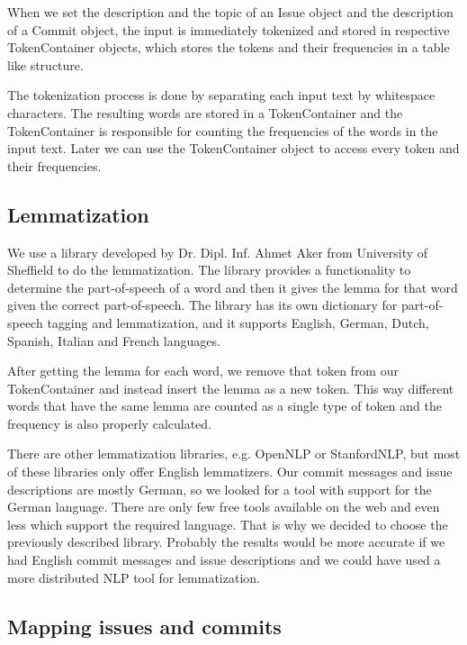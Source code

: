 When we set the description and the topic of an Issue object and the description of a Commit object, the input is immediately tokenized and stored in respective TokenContainer objects, which stores the tokens and their frequencies in a table like structure.

The tokenization process is done by separating each input text by whitespace characters.
The resulting words are stored in a TokenContainer and the TokenContainer is responsible for counting the frequencies of the words in the input text.
Later we can use the TokenContainer object to access every token and their frequencies.


\subsection{Lemmatization}

We use a library developed by Dr. Dipl. Inf. Ahmet Aker from University of Sheffield to do the lemmatization.
The library provides a functionality to determine the part-of-speech of a word and then it gives the lemma for that word given the correct part-of-speech.
The library has its own dictionary for part-of-speech tagging and lemmatization, and it supports English, German, Dutch, Spanish, Italian and French languages.

After getting the lemma for each word, we remove that token from our TokenContainer and instead insert the lemma as a new token.
This way different words that have the same lemma are counted as a single type of token and the frequency is also properly calculated.

There are other lemmatization libraries, e.g. OpenNLP or StanfordNLP, but most of these libraries only offer English lemmatizers.
Our commit messages and issue descriptions are mostly German, so we looked for a tool with support for the German language.
There are only few free tools available on the web and even less which support the required language.
That is why we decided to choose the previously described library.
Probably the results would be more accurate if we had English commit messages and issue descriptions and we could have used a more distributed NLP tool for lemmatization.

\subsection{Mapping issues and commits}

